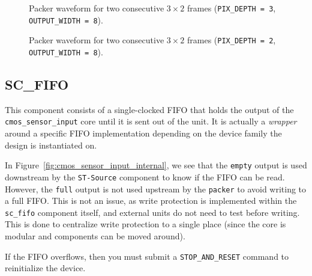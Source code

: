 \documentclass{article}
\def \cmossensorinput {\texttt{cmos\_sensor\_input} }
\begin{document}
\begin{figure}[h!]
    \centering
    \caption{Packer waveform for two consecutive $3\times2$ frames (\texttt{PIX\_DEPTH = 3}, \texttt{OUTPUT\_WIDTH = 8}).}
    \label{fig:packer_waveform}
\end{figure}

\begin{figure}[h!]
    \centering
    \caption{Packer waveform for two consecutive $3\times2$ frames (\texttt{PIX\_DEPTH = 2}, \texttt{OUTPUT\_WIDTH = 8}).}
    \label{fig:packer_waveform2}
\end{figure}

\subsection{SC\_FIFO}
This component consists of a single-clocked FIFO that holds the output of the \cmossensorinput core until it is sent out of the unit. It is actually a \emph{wrapper} around a specific FIFO implementation depending on the device family the design is instantiated on.

In Figure~\ref{fig:cmos_sensor_input_internal}, we see that the \texttt{empty} output is used downstream by the \texttt{ST-Source} component to know if the FIFO can be read.
However, the \texttt{full} output is not used upstream by the \texttt{packer} to avoid writing to a full FIFO.
This is not an issue, as write protection is implemented within the \texttt{sc\_fifo} component itself, and external units do not need to test before writing.
This is done to centralize write protection to a single place (since the core is modular and components can be moved around).

If the FIFO overflows, then you must submit a \texttt{STOP\_AND\_RESET} command to reinitialize the device.
\end{document}
